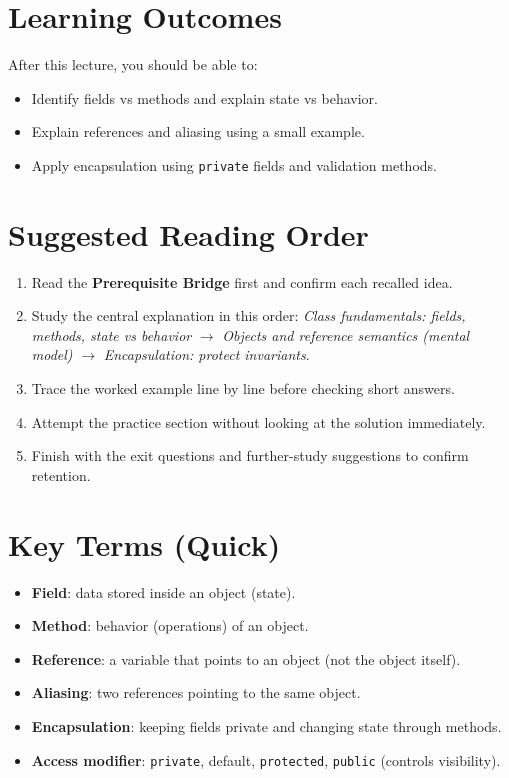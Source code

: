 \documentclass[11pt]{article}
\begin{document}
\section{Learning Outcomes}
After this lecture, you should be able to:
\begin{itemize}
  \item Identify fields vs methods and explain state vs behavior.
  \item Explain references and aliasing using a small example.
  \item Apply encapsulation using \texttt{private} fields and validation methods.
\end{itemize}

\section{Suggested Reading Order}
\begin{enumerate}
  \item Read the \textbf{Prerequisite Bridge} first and confirm each recalled idea.
  \item Study the central explanation in this order: \textit{Class fundamentals: fields, methods, state vs behavior} $\rightarrow$ \textit{Objects and reference semantics (mental model)} $\rightarrow$ \textit{Encapsulation: protect invariants}.
  \item Trace the worked example line by line before checking short answers.
  \item Attempt the practice section without looking at the solution immediately.
  \item Finish with the exit questions and further-study suggestions to confirm retention.
\end{enumerate}
\notesources{\OOPSUnitIISources}

\section{Key Terms (Quick)}
\begin{itemize}
  \item \textbf{Field}: data stored inside an object (state).
  \item \textbf{Method}: behavior (operations) of an object.
  \item \textbf{Reference}: a variable that points to an object (not the object itself).
  \item \textbf{Aliasing}: two references pointing to the same object.
  \item \textbf{Encapsulation}: keeping fields private and changing state through methods.
  \item \textbf{Access modifier}: \texttt{private}, default, \texttt{protected}, \texttt{public} (controls visibility).
\end{itemize}
\end{document}

